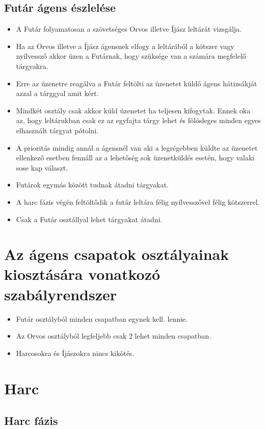 \subsection{Futár ágens észlelése}

\begin{itemize}
  \item A Futár folyamatosan a szövetséges Orvos illetve Íjász leltárát vizsgálja.
  \item Ha az Orvos illetve a Íjász ágensnek elfogy a leltárából a kötszer vagy nyílvessző akkor üzen a Futárnak, hogy szüksége van a számára megfelelő tárgyakra.
  \item Erre az üzenetre reagálva a Futár feltölti az üzenetet küldő ágens hátizsákját azzal a tárggyal amit kért.
  \item Mindkét osztály csak akkor küld üzenetet ha teljesen kifogytak. Ennek oka az, hogy leltárukban csak ez az egyfajta tárgy lehet és fölösleges minden egyes elhasznált tárgyat pótolni.
  \item A prioritás mindig annál a ágensnél van aki a legrégebben küldte az üzenetet ellenkező esetben fennáll az a lehetőség sok üzenetküldés esetén, hogy valaki sose kap választ.
  \item Futárok egymás között tudnak átadni tárgyakat.
  \item A harc fázis végén feltöltődik a futár leltára félig nyílvesszővel félig kötszerrel.
  \item Csak a Futár osztállyal lehet tárgyakat átadni.
\end{itemize}

\section{Az ágens csapatok osztályainak kiosztására vonatkozó szabályrendszer}

\begin{itemize}
	\item Futár osztályból minden csapatban egynek kell. lennie.
	\item Az Orvos osztályból legfeljebb csak 2 lehet minden csapatban.
	\item Harcosokra és Íjászokra nincs kikötés.
\end{itemize}

\section{Harc}

\subsection{Harc fázis}

